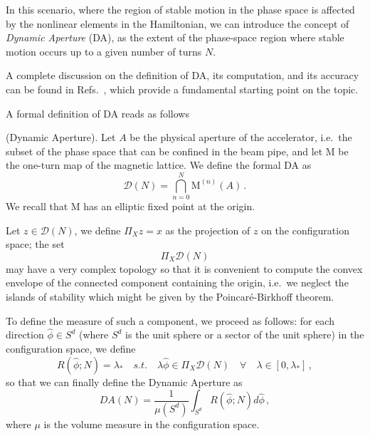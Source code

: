 In this scenario, where the region of stable motion in the phase space is affected by the nonlinear elements in the Hamiltonian, we can introduce the concept of \textit{Dynamic Aperture} (DA), as the extent of the phase-space region where stable motion occurs up to a given number of turns $N$.

A complete discussion on the definition of DA, its computation, and its accuracy can be found in Refs.~\cite{PhysRevE.53.4067, invlog}, which provide a fundamental starting point on the topic.

A formal definition of DA reads as follows
\begin{definition}
	(Dynamic Aperture). Let \(A\) be the physical aperture of the accelerator, i.e.\ the subset of the phase space that can be confined in the beam pipe, and let \(\mathrm{M}\) be the one-turn map of the magnetic lattice. We define the formal DA as
	\begin{equation}
		\mathcal{D}(N)=\bigcap_{n=0}^N \mathrm{M}^{(n)}(A)\,.
	\end{equation}
	We recall that \(\mathrm{M}\) has an elliptic fixed point at the origin.

	Let \(z\in \mathcal{D}(N)\), we define \(\Pi_X z=x\) as the projection of \(z\) on the configuration space; the set
	\begin{equation}
		\Pi_X\mathcal{D}(N)
	\end{equation}
	may have a very complex topology so that it is convenient to compute the convex envelope of the connected component containing the origin, i.e.\ we neglect the islands of stability which might be given by the Poincaré-Birkhoff theorem.

	To define the measure of such a component, we proceed as follows: for each direction \(\hat \phi\in S^d\)  (where \(S^d\) is the unit sphere or a sector of the unit sphere) in the configuration space, we define
	\begin{equation}
	    R(\hat \phi; N)=\lambda_\ast\quad s.t.\quad \lambda \hat\phi\in \Pi_X \mathcal{D}(N)\quad \forall \quad \lambda\in[0,\lambda_\ast]\,,
	    \label{eq:ideal-R}
	\end{equation}
	so that we can finally define the Dynamic Aperture as
	\begin{equation}
        DA(N)=\frac{1}{\mu(S^d)}\int_{S^d} R(\hat \phi; N)d\hat\phi\,,
        \label{eq:formal_da}
	\end{equation}
	where \(\mu\) is the volume measure in the configuration space.
	\label{def:dynamic_aperture}
\end{definition}

